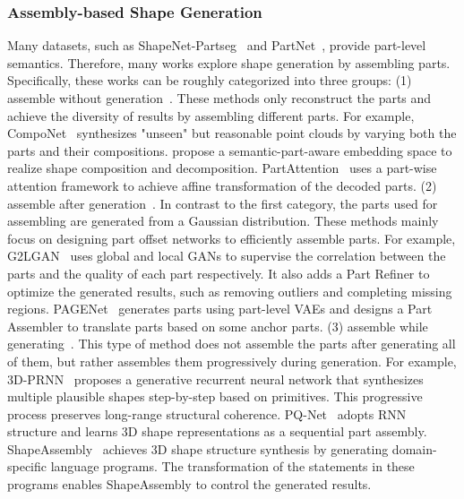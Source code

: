 \documentclass[letterpaper]{article} %
\begin{document}
\subsubsection{Assembly-based Shape Generation}

Many datasets, such as ShapeNet-Partseg~\citep{Yi16} and PartNet~\citep{Mo_2019_CVPR}, provide part-level semantics. Therefore, many works explore shape generation by assembling parts. Specifically, these works can be roughly categorized into three groups: (1) assemble without generation~\citep{Schor_2019_ICCV,Dubrovina_2019_ICCV,yin2020coalesce,Hui_2022_CVPR,wu2023attention}. These methods only reconstruct the parts and achieve the diversity of results by assembling different parts. For example, CompoNet~\citep{Schor_2019_ICCV} synthesizes "unseen" but reasonable point clouds by varying both the parts and their compositions. \citet{Dubrovina_2019_ICCV} propose a semantic-part-aware embedding space to realize shape composition and decomposition. PartAttention~\citep{wu2023attention} uses a part-wise attention framework to achieve affine transformation of the decoded parts. (2) assemble after generation~\citep{li_sig17,Wang_TOG_2018,Wu_TOG_2019,Li_Niu_Xu_2020}. In contrast to the first category, the parts used for assembling are generated from a Gaussian distribution. These methods mainly focus on designing part offset networks to efficiently assemble parts. For example, G2LGAN~\citep{Wang_TOG_2018} uses global and local GANs to supervise the correlation between the parts and the quality of each part respectively. It also adds a Part Refiner to optimize the generated results, such as removing outliers and completing missing regions. PAGENet~\citep{Li_Niu_Xu_2020} generates parts using part-level VAEs and designs a Part Assembler to translate parts based on some anchor parts. (3) assemble while generating~\citep{Zou_2017_ICCV,mo2019structurenet,Mo_2020_CVPR,Wu_2020_CVPR,jones2020shapeAssembly,wang2022shape,Zhuang_2022}. This type of method does not assemble the parts after generating all of them, but rather assembles them progressively during generation. For example, 3D-PRNN~\citep{Zou_2017_ICCV} proposes a generative recurrent neural network that synthesizes multiple plausible shapes step-by-step based on primitives. This progressive process preserves long-range structural coherence. PQ-Net~\citep{Wu_2020_CVPR} adopts RNN structure and learns 3D shape representations as a sequential part assembly. ShapeAssembly~\citep{jones2020shapeAssembly} achieves 3D shape structure synthesis by generating domain-specific language programs. The transformation of the statements in these programs enables ShapeAssembly to control the generated results.
\end{document}
